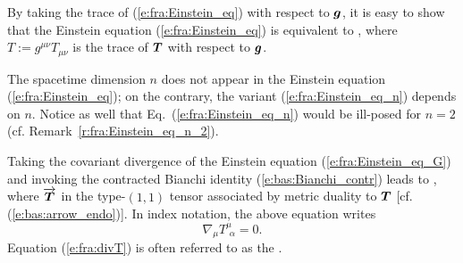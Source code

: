 By taking the trace of (\ref{e:fra:Einstein_eq}) with respect to $\bm{g}$, it is
easy to show that the Einstein equation (\ref{e:fra:Einstein_eq}) is
equivalent to
\be \label{e:fra:Einstein_eq_n}
    ,
\ee
where $T := g^{\mu\nu} T_{\mu\nu}$ is the trace of $\bm{T}$ with respect to
$\bm{g}$.

\begin{remark}
The spacetime dimension $n$ does not appear in the Einstein equation
(\ref{e:fra:Einstein_eq}); on the contrary, the variant
(\ref{e:fra:Einstein_eq_n}) depends on $n$. Notice as well that
Eq.~(\ref{e:fra:Einstein_eq_n}) would be ill-posed for $n=2$
(cf. Remark~\ref{r:fra:Einstein_eq_n_2}).
\end{remark}

Taking the covariant divergence of the Einstein equation (\ref{e:fra:Einstein_eq_G})
and invoking the contracted Bianchi identity (\ref{e:bas:Bianchi_contr}) leads
to
\be \label{e:fra:divT}
    ,
\ee
where $\overrightarrow{\bm{T}}$ in the type-$(1,1)$ tensor associated by metric duality
to $\bm{T}$ [cf. (\ref{e:bas:arrow_endo})]. In index notation, the above
equation writes
\[
    \nabla_\mu T^\mu_{\ \, \alpha} = 0 .
\]
Equation (\ref{e:fra:divT}) is often referred to as the .



